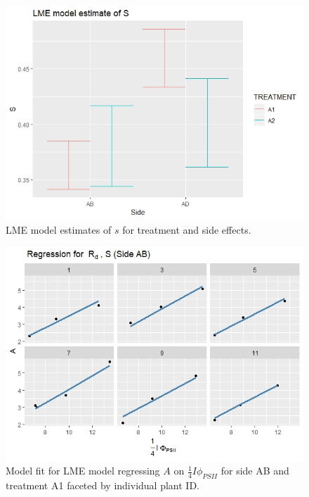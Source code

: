 \documentclass[11pt]{article} %
\begin{document}
\begin{figure}[h]
\centering
\includegraphics[scale=0.80]{Images/lme_estimate_s}
\caption{LME model estimates of $s$ for treatment and side effects.}
\label{fig:lme_s}
\end{figure}

\begin{figure}[h]
\centering
\includegraphics[scale=0.75]{Images/rd_s_ab}
\caption{Model fit for LME model regressing $A$ on $\frac{1}{4} I \phi_{PSII}$ for side AB and treatment A1 faceted by individual plant ID.}
\label{fig:lme_fit_ab}
\end{figure}
\end{document}
